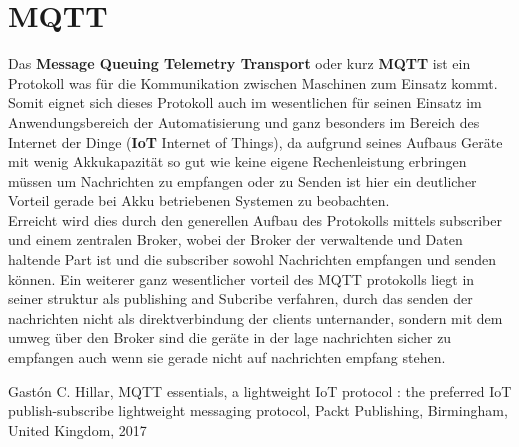 \documentclass[conference]{IEEEtran}
\begin{document}
\section{MQTT}
Das \textbf{Message Queuing Telemetry Transport} oder kurz \textbf{MQTT} ist ein Protokoll was für die Kommunikation zwischen Maschinen zum Einsatz kommt. Somit eignet sich dieses Protokoll auch im wesentlichen für seinen Einsatz im Anwendungsbereich der Automatisierung und ganz besonders im Bereich des Internet der Dinge (\textbf{IoT} Internet of Things), da aufgrund seines Aufbaus Geräte mit wenig Akkukapazität so gut wie keine eigene Rechenleistung erbringen müssen um Nachrichten zu empfangen oder zu Senden ist hier ein deutlicher Vorteil gerade bei Akku betriebenen Systemen zu beobachten.\\ 
Erreicht wird dies durch den generellen Aufbau des Protokolls mittels subscriber und einem zentralen Broker, wobei der Broker der verwaltende und Daten haltende Part ist und die subscriber sowohl Nachrichten empfangen und senden können. Ein weiterer ganz wesentlicher vorteil des MQTT protokolls liegt in seiner struktur als publishing and Subcribe verfahren, durch das senden der nachrichten nicht als direktverbindung der clients unternander, sondern mit dem umweg über den Broker sind die geräte in der lage nachrichten sicher zu empfangen auch wenn sie gerade nicht auf nachrichten empfang stehen.\cite{b1}
\begin{thebibliography}{00}
  Gastón C. Hillar, MQTT essentials, a lightweight IoT protocol : the preferred IoT publish-subscribe lightweight messaging protocol, Packt Publishing, Birmingham, United Kingdom, 2017 
\end{thebibliography}
\vspace{12pt}
\end{document}
